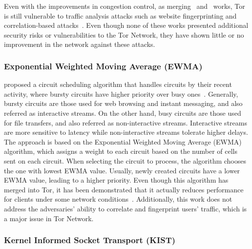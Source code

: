 Even with the improvements in congestion control, as merging~\citeauthor{EWMA} and~\citeauthor{KIST} works, Tor is still vulnerable to traffic analysis attacks such as website fingerprinting and correlation-based attacks~\cite*{KIST}. Even though none of these works presented additional security risks or vulnerabilities to the Tor Network, they have shown little or no improvement in the network against these attacks.

\subsubsection{Exponential Weighted Moving Average (EWMA)}\label{subsubsec:exponentialwma}

\citeauthor{EWMA} proposed a circuit scheduling algorithm that handles circuits by their recent activity, where bursty circuits have higher priority over busy ones~\cite{EWMA}. Generally, bursty circuits are those used for web browsing and instant messaging, and also referred as interactive streams. On the other hand, busy circuits are those used for file transfers, and also referred as non-interactive streams. Interactive streams are more sensitive to latency while non-interactive streams tolerate higher delays.
The approach is based on the Exponential Weighted Moving Average (EWMA) algorithm, which assigns a weight to each circuit based on the number of cells sent on each circuit. When selecting the circuit to process, the algorithm chooses the one with lowest EWMA value. Usually, newly created circuits have a lower EWMA value, leading to a higher priority. 
Even though this algorithm has merged into Tor, it has been demonstrated that it actually reduces performance for clients under some network conditions~\cite{shadow-ndss2012}. Additionally, this work does not address the adversaries' ability to correlate and fingerprint users' traffic, which is a major issue in Tor Network.

\subsubsection{Kernel Informed Socket Transport (KIST)}\label{subsubsec:kist}


